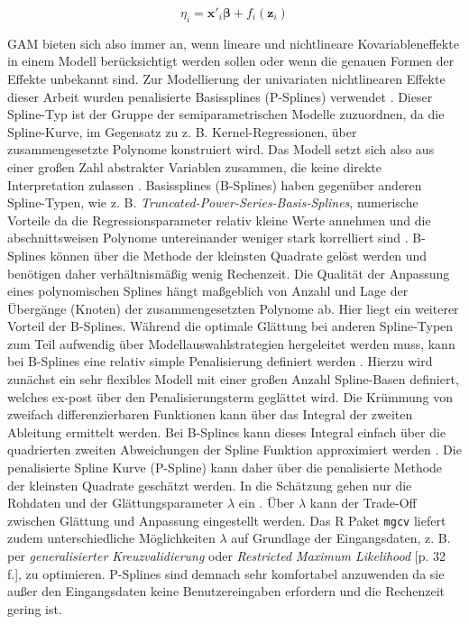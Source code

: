 \documentclass{Vorlage}
\begin{document}
\begin{equation} \label{SplinePraed}
\eta_{i} =\mathbf{x}'_i \boldsymbol{\beta}+f_{i}(\mathbf{z}_{i})
\end{equation}

GAM bieten sich also immer an, wenn lineare und nichtlineare Kovariableneffekte in einem Modell berücksichtigt werden sollen oder wenn die genauen Formen der Effekte unbekannt sind. Zur Modellierung der univariaten nichtlinearen Effekte dieser Arbeit wurden penalisierte Basissplines (P-Splines) verwendet \cite{eilers1996}. Dieser Spline-Typ ist der Gruppe der semiparametrischen Modelle zuzuordnen, da die Spline-Kurve, im Gegensatz zu z. B. Kernel-Regressionen, über zusammengesetzte Polynome konstruiert wird. Das Modell setzt sich also aus einer großen Zahl abstrakter Variablen zusammen, die keine direkte Interpretation zulassen \cite[p. 1]{eilers1996}. Basissplines (B-Splines) haben gegenüber anderen Spline-Typen, wie z. B. \textit{Truncated-Power-Series-Basis-Splines}, numerische Vorteile da die Regressionsparameter relativ kleine Werte annehmen und die abschnittsweisen Polynome untereinander weniger stark korrelliert sind \cite[p. 426]{fahrmeir2013regression}. B-Splines können über die Methode der kleinsten Quadrate gelöst werden \cite[p. 430]{fahrmeir2013regression} und benötigen daher verhältnismäßig wenig Rechenzeit. Die Qualität der Anpassung eines polynomischen Splines hängt maßgeblich von Anzahl und Lage der Übergänge (Knoten) der zusammengesetzten Polynome ab. Hier liegt ein weiterer Vorteil der B-Splines. Während die optimale Glättung bei anderen Spline-Typen zum Teil aufwendig über Modellauswahlstrategien hergeleitet werden muss, kann bei B-Splines eine relativ simple Penalisierung definiert werden \cite[p. 89 f.]{eilers1996}. Hierzu wird zunächst ein sehr flexibles Modell mit einer großen Anzahl Spline-Basen definiert, welches ex-post über den Penalisierungsterm geglättet wird. Die Krümmung von zweifach differenzierbaren Funktionen kann über das Integral der zweiten Ableitung ermittelt werden. Bei B-Splines kann dieses Integral einfach über die quadrierten zweiten Abweichungen der Spline Funktion approximiert werden \cite[p. 433]{fahrmeir2013regression}. Die penalisierte Spline Kurve (P-Spline) kann daher über die penalisierte Methode der kleinsten Quadrate geschätzt werden. In die Schätzung gehen nur die Rohdaten und der Glättungsparameter $\lambda$ ein \cite[p. 93]{eilers1996}. Über $\lambda$ kann der Trade-Off zwischen Glättung und Anpassung eingestellt werden. Das R Paket \texttt{mgcv} \cite{Wood2011} liefert zudem unterschiedliche Möglichkeiten $\lambda$ auf Grundlage der Eingangsdaten, z. B. per \textit{generalisierter Kreuzvalidierung} \cite[p. 480]{fahrmeir2013regression} oder \textit{Restricted Maximum Likelihood} \cite{wood2016}[p. 32 f.], zu optimieren. P-Splines sind demnach sehr komfortabel anzuwenden da sie außer den Eingangsdaten keine Benutzereingaben erfordern und die Rechenzeit gering ist.\\
\end{document}
